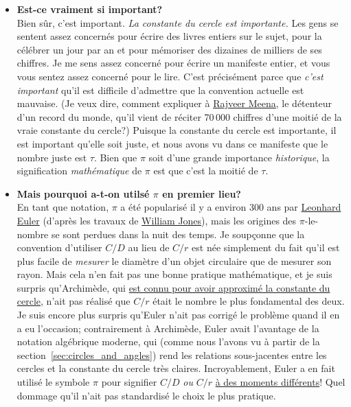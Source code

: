 \begin{itemize}
  \item \textbf{Est-ce vraiment si important\ns?} \\ Bien sûr, c'est important.
  \emph{La constante du cercle est importante.} Les gens se sentent assez concernés
  pour écrire des livres entiers sur le sujet, pour la célébrer un
  jour par an et pour mémoriser des dizaines de milliers de
  ses chiffres. Je me sens assez concerné pour écrire un manifeste entier, et vous
  vous sentez assez concerné pour le lire. C'est précisément parce que \emph{c'est
  important} qu'il est difficile d'admettre que la convention actuelle est
  mauvaise. (Je veux dire, comment expliquer à
  \href{https://translate.google.com/translate?hl=en&sl=en&tl=fr&u=https://www.guinnessworldrecords.com/world-records/most-pi-places-memorised}{Rajveer
  Meena}, le détenteur d'un record du monde, qu'il vient de réciter 70\,000
  chiffres d'une moitié de la vraie constante du cercle\ns?) Puisque la constante
  du cercle est importante, il est important qu'elle soit juste, et nous avons
  vu dans ce manifeste que le nombre juste est $\tau$. Bien que $\pi$ soit d'une
  grande importance \emph{historique}, la signification \emph{mathématique} de
  $\pi$ est que c'est la moitié de $\tau$.

  \item \textbf{Mais pourquoi a-t-on utilsé $\pi$ en premier lieu\ns?}
  \\ En tant que notation, $\pi$ a été popularisé il y a environ 300 ans par
  \href{https://fr.wikipedia.org/wiki/Leonhard_Euler}{Leonhard Euler} (d'après
  les travaux de
  \href{https://fr.wikipedia.org/wiki/William_Jones_(mathématicien)}{William
  Jones}), mais les origines des $\pi$-le-nombre se sont perdues dans la nuit des
  temps. Je soupçonne que la convention d'utiliser $C/D$ au lieu de $C/r$ est
  née simplement du fait qu'il est plus facile de \emph{mesurer} le diamètre d'un
  objet circulaire que de mesurer son rayon. Mais cela n'en fait pas une bonne pratique
  mathématique, et je suis surpris qu'Archimède, qui \href{https://translate.google.com/translate?hl=en&sl=en&tl=fr&u=http://itech.fgcu.edu/faculty/clindsey/mhf4404/archimedes/archimedes.html}{est
  connu pour avoir approximé la constante du cercle}, n'ait pas réalisé que $C/r$ était
  le nombre le plus fondamental des deux. Je suis encore plus surpris qu'Euler n'ait pas
  corrigé le problème quand il en a eu l'occasion\ns; contrairement à Archimède,
  Euler avait l'avantage de la notation algébrique moderne, qui (comme nous
  l'avons vu à partir de la section~\ref{sec:circles_and_angles}) rend les
  relations sous-jacentes entre les cercles et la constante du cercle très
  claires. Incroyablement, Euler a en fait utilisé le symbole $\pi$ pour
  signifier $C/D$ \emph{ou} $C/r$
  \href{https://translate.google.com/translate?hl=en&sl=en&tl=fr&u=https%3A%2F%2Fen.wikipedia.org%2Fwiki%2FPi%23Adoption_of_the_symbol_π&sandbox=1}{à
  des moments
  différents}\ns! Quel dommage qu'il n'ait pas standardisé le choix le plus
  pratique.


\end{itemize}
